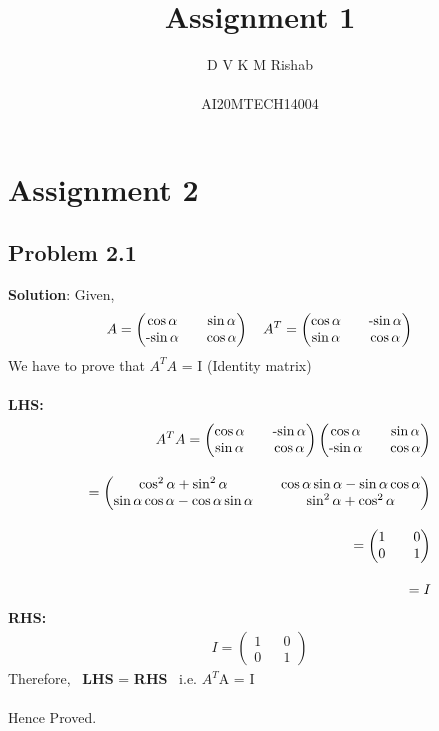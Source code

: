 \documentclass{article}
\title{Assignment 1}
\author{D V K M Rishab \\ \\ AI20MTECH14004}
\date{}
\newcommand{\myvec}[1]{\ensuremath{\begin{pmatrix}#1\end{pmatrix}}}
\begin{document}
\let\vec\mathbf
\maketitle
\section*{Assignment 2}
\subsection*{Problem 2.1}
\textbf{Solution}:
Given,
\begin{align}
A = \myvec{\cos{\alpha} && \sin{\alpha} \\ $-$\sin{\alpha} && \cos{\alpha}} \quad
A^T = \myvec{\cos{\alpha} && $-$\sin{\alpha} \\ \sin{\alpha} && \cos{\alpha}}
\end{align}
We have to prove that $A^TA$ = I (Identity matrix) \\\\
\textbf{LHS:}\quad
\begin{align}
A^TA = \myvec{\cos{\alpha} && $-$\sin{\alpha} \\ \sin{\alpha} && \cos{\alpha}} \myvec{\cos{\alpha} && \sin{\alpha} \\ $-$\sin{\alpha} && \cos{\alpha}}\\[1em]
= \myvec{\cos^2{\alpha}+\sin^2{\alpha} && \cos{\alpha}\sin{\alpha}- \sin{\alpha}\cos{\alpha} \\ \sin{\alpha}\cos{\alpha}-\cos{\alpha}\sin{\alpha} && \sin^2{\alpha}+\cos^2{\alpha}}\\[1em]
= \myvec{1 && 0\\0 && 1} \\[1em]
= I
\end{align}
\textbf{RHS:}\quad
\begin{align}
I = \myvec{1 && 0\\0 && 1}
\end{align}
Therefore, \ \textbf{LHS} = \textbf{RHS} \ i.e. $A^T$A = I \\\\
Hence Proved.
\end{document}

